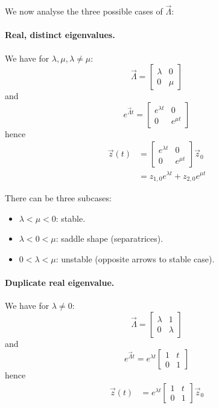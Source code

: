 We now analyse the three possible cases of $\vec \Lambda$:

\paragraph{Real, distinct eigenvalues.} We have for $\lambda, \mu, \lambda \neq \mu$:
\begin{equation*}
	\vec \Lambda = 
	\begin{bmatrix}
		\lambda & 0 \\
		0 & \mu
	\end{bmatrix}
\end{equation*}
and
\begin{equation*}
	e^{\vec \Lambda t} =
		\begin{bmatrix}
			e^{\lambda t}	& 0 \\
			0 				& e^{\mu t}
		\end{bmatrix}
\end{equation*}
hence
\begin{align*}
	\vec z(t) 	&= 
		\begin{bmatrix}
			e^{\lambda t}	& 0 \\
			0 				& e^{\mu t}
		\end{bmatrix}
		\vec z_0 \\
				&= z_{1, 0} e^{\lambda t} + z_{2, 0} e^{\mu t}
\end{align*}

There can be three subcases:
\begin{itemize}
	\item $\lambda < \mu < 0$: stable.
	\item $\lambda < 0 < \mu$: saddle shape (separatrices).
	\item $0 < \lambda < \mu$: unstable (opposite arrows to stable case).
\end{itemize}

\paragraph{Duplicate real eigenvalue.} We have for $\lambda \neq 0$:
\begin{equation*}
	\vec \Lambda = 
	\begin{bmatrix}
		\lambda & 1 \\
		0 & \lambda
	\end{bmatrix}
\end{equation*}
and
\begin{equation*}
	e^{\vec \Lambda t} = 
		e^{\lambda t}
		\begin{bmatrix}
			1 	& t \\
			0 	& 1
		\end{bmatrix}
\end{equation*}
hence
\begin{align*}
	\vec z(t) 	&= 
		e^{\lambda t}
		\begin{bmatrix}
			1 	& t \\
			0 	& 1
		\end{bmatrix}
		\vec z_0
\end{align*}


